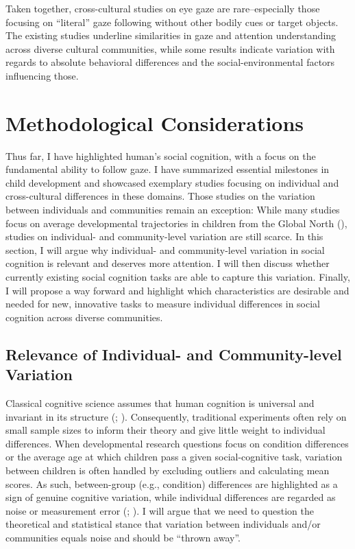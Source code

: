 \documentclass[
]{scrbook}
\begin{document}
Taken together, cross-cultural studies on eye gaze are rare\thinspace --\thinspace especially those focusing on ``literal'' gaze following without other bodily cues or target objects. The existing studies underline similarities in gaze and attention understanding across diverse cultural communities, while some results indicate variation with regards to absolute behavioral differences and the social-environmental factors influencing those.

\section{Methodological Considerations}\label{intro-methods}

Thus far, I have highlighted human's social cognition, with a focus on the fundamental ability to follow gaze. I have summarized essential milestones in child development and showcased exemplary studies focusing on individual and cross-cultural differences in these domains. Those studies on the variation between individuals and communities remain an exception: While many studies focus on average developmental trajectories in children from the Global North (), studies on individual- and community-level variation are still scarce. In this section, I will argue why individual- and community-level variation in social cognition is relevant and deserves more attention. I will then discuss whether currently existing social cognition tasks are able to capture this variation. Finally, I will propose a way forward and highlight which characteristics are desirable and needed for new, innovative tasks to measure individual differences in social cognition across diverse communities.

\subsection{Relevance of Individual- and Community-level Variation}\label{relevance-of-individual--and-community-level-variation}

Classical cognitive science assumes that human cognition is universal and invariant in its structure (; ). Consequently, traditional experiments often rely on small sample sizes to inform their theory and give little weight to individual differences. When developmental research questions focus on condition differences or the average age at which children pass a given social-cognitive task, variation between children is often handled by excluding outliers and calculating mean scores. As such, between-group (e.g., condition) differences are highlighted as a sign of genuine cognitive variation, while individual differences are regarded as noise or measurement error (; ). I will argue that we need to question the theoretical and statistical stance that variation between individuals and/or communities equals noise and should be ``thrown away''.
\end{document}
